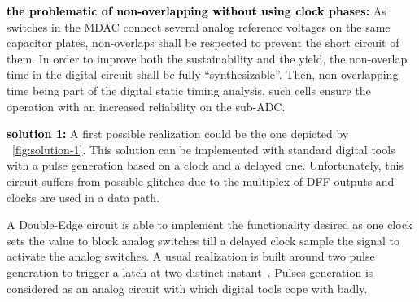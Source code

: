 \textbf{\textcolor{black}{the problematic of non-overlapping without using clock phases:}}
As switches in the MDAC connect several analog reference voltages on the same capacitor plates, non-overlaps shall be respected to prevent the short circuit of them. In order to improve both the sustainability and the yield, the non-overlap time in the digital circuit shall be fully ``synthesizable''. Then, non-overlapping time being part of the digital static timing analysis, such cells ensure the operation with an increased reliability on the sub-ADC\@.

\textbf{\textcolor{black}{solution 1:}}
A first possible realization could be the one depicted by \figurename~\ref{fig:solution-1}. This solution can be implemented with standard digital tools with a pulse generation based on a clock and a delayed one. Unfortunately, this circuit suffers from possible glitches due to the multiplex of DFF outputs and clocks are used in a data path.

A Double-Edge circuit is able to implement the functionality desired as one clock sets the value to block analog switches till a delayed clock sample the signal to activate the analog switches. A usual realization is built around two pulse generation to trigger a latch at two distinct instant~\cite{Afghahi1996, Cheng2003dig, Murotiya2013, Bonetti2015}. Pulses generation is considered as an analog circuit with which digital tools cope with badly.

